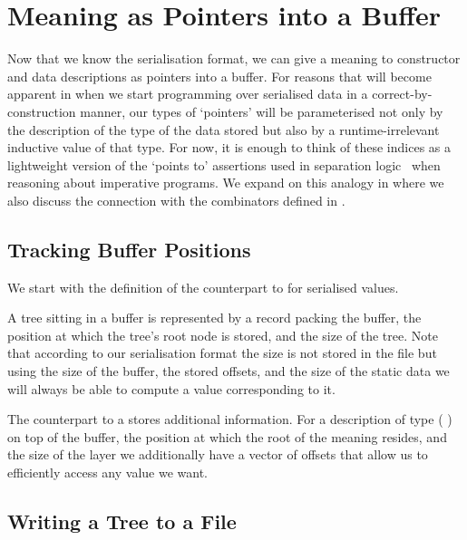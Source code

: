 \section{Meaning as Pointers into a Buffer}\label{sec:pointers}

Now that we know the serialisation format, we can give a meaning
to constructor and data descriptions as pointers into a buffer.
%
For reasons that will become apparent in 
when we start programming over serialised data in a correct-by-construction
manner, our types of `pointers' will be parameterised not only
by the description of the type of the data stored but also by a
runtime-irrelevant inductive value of that type.
%
For now, it is enough to think of these indices as a lightweight
version of the `points to' assertions used in separation
logic~\citep{DBLP:conf/lics/Reynolds02}
when reasoning about imperative programs.
%
We expand on this analogy in  where we
also discuss the connection with the combinators defined
in .

\subsection{Tracking Buffer Positions}

We start with the definition of the counterpart to 
for serialised values.


A tree sitting in a buffer is represented
by a record packing the buffer, the position at which the tree's
root node is stored, and the size of the tree.
%
Note that according to our serialisation format the size is not stored
in the file but using the size of the buffer, the stored offsets,
and the size of the static data we will always
be able to compute a value corresponding to it.


The counterpart to a  stores additional information.
%
For a description of type (   )
on top of the buffer, the position at which the root of the meaning resides,
and the size of the layer we additionally have a vector of  offsets
that allow us to efficiently access any value we want.

\subsection{Writing a Tree to a File}\label{sec:writetofile}

